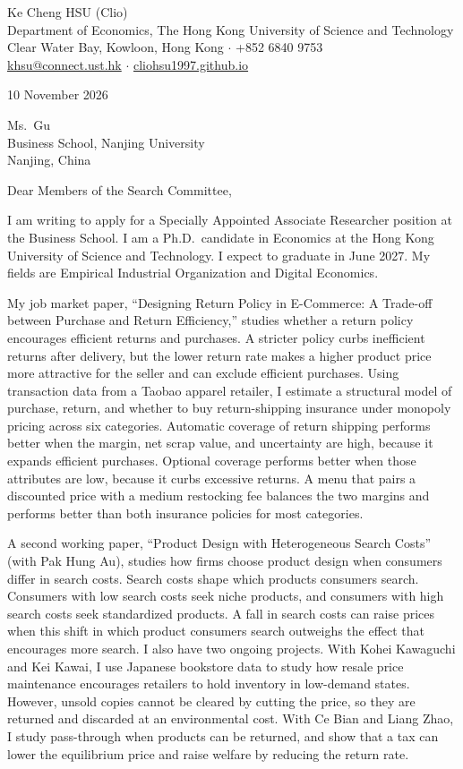 \documentclass[11pt]{article}
\begin{document}
\begin{flushleft}
Ke Cheng HSU (Clio) \\
Department of Economics, The Hong Kong University of Science and Technology \\
Clear Water Bay, Kowloon, Hong Kong $\cdot$ +852 6840 9753 \\
\href{mailto:khsu@connect.ust.hk}{khsu@connect.ust.hk} $\cdot$ \href{https://cliohsu1997.github.io/}{cliohsu1997.github.io}
\end{flushleft}

10 November 2026

\vspace{0.1em}
Ms.\ Gu \\
Business School, Nanjing University \\
Nanjing, China

\vspace{0.1em}
Dear Members of the Search Committee,

I am writing to apply for a Specially Appointed Associate Researcher position at the Business School. I am a Ph.D.\ candidate in Economics at the Hong Kong University of Science and Technology. I expect to graduate in June 2027. My fields are Empirical Industrial Organization and Digital Economics.

My job market paper, ``Designing Return Policy in E-Commerce: A Trade-off between Purchase and Return Efficiency,'' studies whether a return policy encourages efficient returns and purchases. A stricter policy curbs inefficient returns after delivery, but the lower return rate makes a higher product price more attractive for the seller and can exclude efficient purchases. Using transaction data from a Taobao apparel retailer, I estimate a structural model of purchase, return, and whether to buy return-shipping insurance under monopoly pricing across six categories. Automatic coverage of return shipping performs better when the margin, net scrap value, and uncertainty are high, because it expands efficient purchases. Optional coverage performs better when those attributes are low, because it curbs excessive returns. A menu that pairs a discounted price with a medium restocking fee balances the two margins and performs better than both insurance policies for most categories.

A second working paper, ``Product Design with Heterogeneous Search Costs'' (with Pak Hung Au), studies how firms choose product design when consumers differ in search costs. Search costs shape which products consumers search. Consumers with low search costs seek niche products, and consumers with high search costs seek standardized products. A fall in search costs can raise prices when this shift in which product consumers search outweighs the effect that encourages more search. I also have two ongoing projects. With Kohei Kawaguchi and Kei Kawai, I use Japanese bookstore data to study how resale price maintenance encourages retailers to hold inventory in low-demand states. However, unsold copies cannot be cleared by cutting the price, so they are returned and discarded at an environmental cost. With Ce Bian and Liang Zhao, I study pass-through when products can be returned, and show that a tax can lower the equilibrium price and raise welfare by reducing the return rate.
\end{document}
